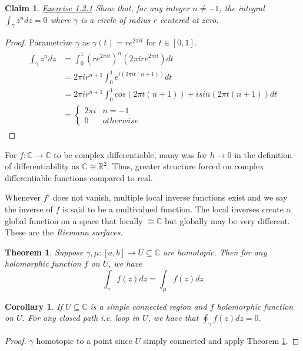 \documentclass{article}
\newtheorem{theorem}{Theorem}[section]
\newtheorem{corollary}{Corollary}[theorem]
\newtheorem{claim}{Claim}[section]
\theoremstyle{definition}
\newcommand{\CC}{\mathbb{C}}
\newcommand{\RR}{\mathbb{R}}
\newcommand{\isom}{\cong} %
\begin{document}
\begin{claim}\label{exc:blue_book_1.2.1}
\underline{Exercise 1.2.1}
Show that, for any integer $n \ne -1$, the integral $\int_{\gamma} z^n dz = 0$ where $\gamma$ is a circle of radius $r$ centered at zero.
\end{claim}
\begin{proof}
Parametrize $\gamma$ as $\gamma(t) = re^{2\pi i t}$ for $t \in [0,1]$.
\begin{align*}
\begin{split}
    \int_{\gamma} z^n dz
    &= \int_0^1 (re^{2{\pi}it})^n (2{\pi}ire^{2{\pi}it}) dt \\
    &= 2{\pi}ir^{n+1} \int_0^1 e^{i(2{\pi}it(n+1))} dt \\
    &= 2{\pi}ir^{n+1} \int_0^1 cos(2{\pi}t(n+1)) + isin(2{\pi}t(n+1)) dt \\
    &=
\begin{cases}
    2{\pi}i & n = -1 \\
    0 & otherwise
\end{cases}
\end{split}
\end{align*}
\end{proof}

For $f: \CC \to \CC$ to be complex differentiable, many was for $h \rightarrow 0$ in the definition of differentiability as $\CC \isom \RR^2$. Thus, greater structure forced on complex differentiable functions compared to real.

Whenever $f'$ does not vanish, multiple local inverse functions exist and we say the inverse of $f$ is said to be a multivalued function. The local inverses create a global function on a space that locally $\isom \CC$ but globally may be very different. These are the \emph{Riemann surfaces}.

\begin{theorem}\label{thm:holomorphic_ftn_homotopic_implies_same_integral}
Suppose $\gamma, \mu: [a,b] \to U \subseteq \CC$ are homotopic. Then for any holomorphic function $f$ on $U$, we have 
\begin{equation*}
    \int_{\gamma} f(z) dz = \int_{\mu} f(z) dz
\end{equation*}
\end{theorem}

\begin{corollary}
If $U \subseteq \CC$ is a simple connected region and $f$ holomorphic function on $U$. For any closed path i.e. loop in $U$, we have that $\oint_{\gamma} f(z) dz = 0$. 
\end{corollary}
\begin{proof}
$\gamma$ homotopic to a point since $U$ simply connected and apply Theorem \ref{thm:holomorphic_ftn_homotopic_implies_same_integral}.
\end{proof}
\end{document}
